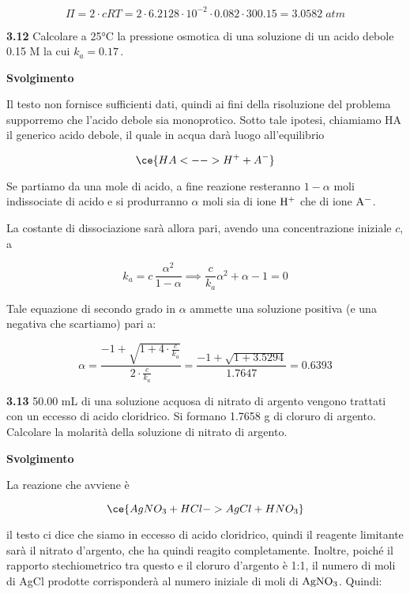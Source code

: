 $$\Pi=2 \cdot cRT
=2 \cdot 6.2128 \cdot 10^{-2} \cdot 0.082 \cdot 300.15
=3.0582\;atm$$

\vspace{0.2cm}\textbf{3.12} Calcolare a 25°C la pressione osmotica di una soluzione di un acido debole 0.15 M la cui $k_a=0.17$\,.

\vspace{0.2cm}\large\textbf{Svolgimento}\normalsize

\vspace{0.2cm}Il testo non fornisce sufficienti dati, quindi ai fini della risoluzione del problema supporremo che l'acido debole sia monoprotico. Sotto tale ipotesi, chiamiamo HA il generico acido debole, il quale in acqua darà luogo all'equilibrio

$$\ce{HA <--> H^+ + A^-}$$

Se partiamo da una mole di acido, a fine reazione resteranno $1 - \alpha$ moli indissociate di acido e si produrranno $\alpha$ moli sia di ione $\rm H^+$ che di ione $\rm A^-$. 

La costante di dissociazione sarà allora pari, avendo una concentrazione iniziale $c$, a

$$k_a=c\,\frac{\alpha^2}{1-\alpha}
\implies
\frac{c}{k_a}\alpha^2 + \alpha -1=0$$

Tale equazione di secondo grado in $\alpha$ ammette una soluzione positiva (e una negativa che scartiamo) pari a:

$$\alpha=\frac{-1 + \sqrt{1 + 4 \cdot \displaystyle \frac{c}{k_a}}}{2 \cdot \displaystyle \frac{c}{k_a}}
=\frac{-1 + \sqrt{1 + 3.5294}}{1.7647}=0.6393$$



\vspace{0.2cm}\textbf{3.13} 50.00 mL di una soluzione acquosa di nitrato di argento vengono trattati con un eccesso di acido
cloridrico. Si formano 1.7658 g di cloruro di argento. Calcolare la molarità della soluzione di nitrato
di argento.

\vspace{0.2cm}\large\textbf{Svolgimento}\normalsize

\vspace{0.2cm}La reazione che avviene è

$$\ce{AgNO_3 + HCl -> AgCl + HNO_3}$$

il testo ci dice che siamo in eccesso di acido cloridrico, quindi il reagente limitante sarà il nitrato d'argento, che ha quindi reagito completamente. Inoltre, poiché il rapporto stechiometrico tra questo e il cloruro d'argento è 1:1, il numero di moli di AgCl prodotte corrisponderà al numero iniziale di moli di $\rm AgNO_3$. Quindi:


